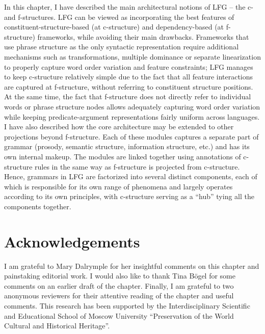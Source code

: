 \documentclass[output=paper]{langscibook}
\begin{document}
In this chapter, I have described the main architectural notions of LFG -- the c- and f-structures. LFG can be viewed as incorporating the best features of constituent-structure-based (at c-structure) and dependency-based (at f-struc\-ture) frameworks, while avoiding their main drawbacks. Frameworks that use phrase structure as the only syntactic representation require additional mechanisms such as transformations, multiple dominance or separate linearization to properly capture word order variation and feature constraints; LFG manages to keep c-structure relatively simple due to the fact that all feature interactions are captured at f-structure, without referring to constituent structure positions. At the same time, the fact that f-structure does not directly refer to individual words or phrase structure nodes allows adequately capturing word order variation while keeping predicate-argument representations fairly uniform across languages.  I have also described how the core architecture may be extended to other projections beyond f-structure. Each of these modules captures a separate part of grammar (prosody, semantic structure, information structure, etc.) and has its own internal makeup. The modules are linked together using annotations of c-structure rules in the same way as f-structure is projected from c-structure. Hence, grammars in LFG are factorized into several distinct components, each of which is responsible for its own range of phenomena and largely operates according to its own principles, with c-structure serving as a ``hub'' tying all the components together.
 
\section*{Acknowledgements}

I am grateful to Mary Dalrymple for her insightful comments on this chapter and painstaking editorial work. I would also like to thank Tina Bögel for some comments on an earlier draft of the chapter. Finally, I am grateful to two anonymous reviewers for their attentive reading of the chapter and useful comments. This research has been supported by the Interdisciplinary Scientific and Educational School of Moscow University ``Preservation of the World Cultural and Historical Heritage''.

\sloppy
\printbibliography[heading=subbibliography,notkeyword=this] 
\end{document}
